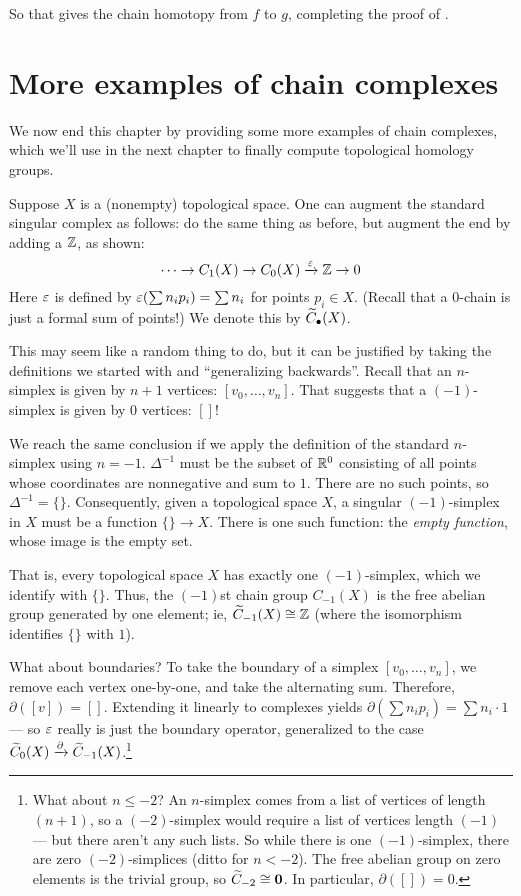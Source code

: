 So that gives the chain homotopy from $f$ to $g$, completing the proof of .

\section{More examples of chain complexes}
We now end this chapter by providing some more examples of chain complexes,
which we'll use in the next chapter to finally compute topological homology groups.

\begin{example}
	Suppose $X$ is a (nonempty) topological space.
	One can augment the standard singular complex as follows:
	do the same thing as before, but augment the end by adding a $\mathbb Z$,
	as shown:
	\[ \dots \to C_1(X) \to C_0(X) \xrightarrow{\varepsilon} \mathbb Z \to 0 \]
	Here $\varepsilon$ is defined by $\varepsilon(\sum n_ip_i) = \sum n_i$ for points $p_i \in X$.
	(Recall that a $0$-chain is just a formal sum of points!)
	We denote this  by $\widetilde C_\bullet(X)$.

	This may seem like a random thing to do, but it can be justified
	by taking the definitions we started with and ``generalizing
	backwards''. Recall that an $n$-simplex is given by $n+1$
	vertices: $[v_0,\ldots,v_n]$. That suggests that a
	$(-1)$-simplex is given by $0$ vertices: $[]$!

	We reach the same conclusion if we apply the definition of the
	standard $n$-simplex using $n=-1$. $\Delta^{-1}$ must be the
	subset of $\mathbb R^0$ consisting of all points whose coordinates are
	nonnegative and sum to $1$. There are no such points, so
	$\Delta^{-1} = \{\}$. Consequently, given a topological space
	$X$, a singular $(-1)$-simplex in $X$ must be a function
	$\{\} \to X$. There is one such function: the \emph{empty
		function}, whose image is the empty set.

	That is, every topological space $X$ has exactly one
	$(-1)$-simplex, which we identify with $\{\}$. Thus, the
	$(-1)$st chain group $C_{-1}(X)$ is the free abelian group
	generated by one element; ie, $\widetilde C_{-1}(X) \cong \mathbb{Z}$
	(where the isomorphism identifies $\{\}$ with $1$).

	What about boundaries? To take the boundary of a simplex
	$[v_0,\ldots,v_n]$, we remove each vertex one-by-one, and take
	the alternating sum. Therefore, $\partial([v]) = []$. Extending
	it linearly to complexes yields
	$\partial(\sum n_ip_i) = \sum n_i \cdot 1$ --- so $\varepsilon$ really is
	just the boundary operator, generalized to the case
	$\widetilde C_0(X) \xrightarrow{\partial} \widetilde C_{-1}(X)$.\footnote{What about
		$n \leq -2$? An $n$-simplex comes from a list of vertices of
		length $(n+1)$, so a $(-2)$-simplex would require a list of
		vertices length $(-1)$ --- but there aren't any such lists. So
		while there is one $(-1)$-simplex, there are zero
		$(-2)$-simplices (ditto for $n < -2$). The free abelian
		group on zero elements is the trivial group, so
		$\widetilde C_{-2} \cong \mathbf{0}$. In particular,
		$\partial([]) = 0$.}
\end{example}

